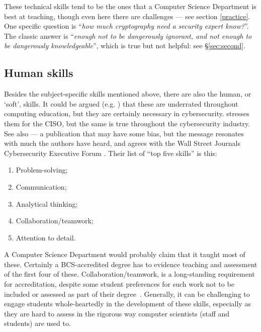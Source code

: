 \documentclass[conference]{IEEEtran}
\begin{document}
\begin{itemize}
These technical skills tend to be the ones that a Computer Science Department is best at teaching, though even here there are challenges --- see section \ref{practice}. One specific question is ``{\emph{how much cryptography need a security expert know?}}''. The classic answer is ``{\emph{enough not to be dangerously ignorant, and not enough to be dangerously knowledgeable}}'', which is true but not helpful: see \S\ref{sec:second}.
\end{itemize}
\subsection{Human skills}\label{sec:human}
Besides the subject-specific skills mentioned above, there are also the human, or `soft', skills. It could be argued (e.g. \cite{Palkar2013a}) that these are underrated throughout computing education, but they are certainly necessary in cybersecurity.
\cite{Froehlich2019a} stresses them for the CISO, but the same is true throughout the cybersecurity industry. See also \cite{InfoSec2019a} ---  a publication that may have some bias, but the message resonates with much the authors have heard, and agrees with the Wall Street Journals Cybersecurity Executive Forum \cite{WallStreetJournal2018c}. Their list of ``top five skills'' is this:
\begin{enumerate}
\item    Problem-solving;
\item    Communication;
\item    Analytical thinking;
\item    Collaboration/teamwork;
\item    Attention to detail.
\end{enumerate}

A Computer Science Department would probably claim that it taught most of these. Certainly a BCS-accredited degree has to evidence teaching and assessment of the first four of these. Collaboration/teamwork, is a long-standing requirement for accreditation, despite some student preferences %
for such work not to be included or assessed as part of their degree~\cite{Cricketal2020a}. Generally, it can be challenging to engage students whole-heartedly in the development of these skills, especially as they are hard to assess in the rigorous way computer scientists (staff and students) are used to. 
\end{document}

